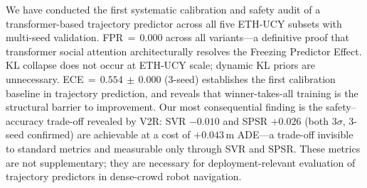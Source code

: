 \documentclass[journal,letterpaper]{IEEEtran}
\begin{document}
We have conducted the first systematic calibration and safety audit of
a transformer-based trajectory predictor across all five ETH-UCY
subsets with multi-seed validation.
FPR\,\(=\,0.000\) across all variants---a definitive proof that
transformer social attention architecturally resolves the Freezing
Predictor Effect.
KL collapse does not occur at ETH-UCY scale; dynamic KL priors are
unnecessary.
ECE\,\(=\,0.554\,\pm\,0.000\) (3-seed) establishes the first
calibration baseline in trajectory prediction, and reveals that
winner-takes-all training is the structural barrier to improvement.
Our most consequential finding is the safety--accuracy trade-off
revealed by V2R: SVR $-0.010$ and SPSR $+0.026$ (both $3\sigma$,
3-seed confirmed) are achievable at a cost of $+0.043$\,m ADE---a
trade-off invisible to standard metrics and measurable only through
SVR and SPSR.
These metrics are not supplementary; they are necessary for
deployment-relevant evaluation of trajectory predictors in dense-crowd
robot navigation.



\end{document}
